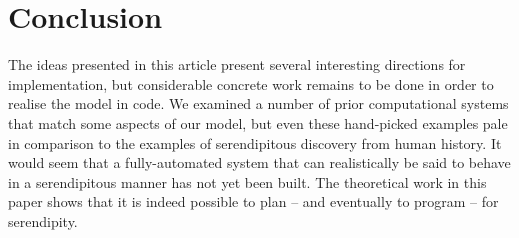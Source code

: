 \section{Conclusion} \label{sec:conclusion}

The ideas presented in this article present several interesting
directions for implementation, but considerable concrete work remains
to be done in order to realise the model in code.  We examined a
number of prior computational systems that match some aspects of our
model, but even these hand-picked examples pale in comparison to the
examples of serendipitous discovery from human history.  It would seem
that a fully-automated system that can realistically be said to behave
in a serendipitous manner has not yet been built.
The theoretical work in this paper shows that it is indeed possible to
plan -- and eventually to program -- for serendipity.
